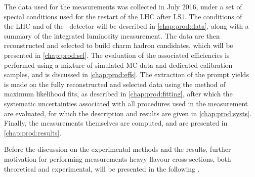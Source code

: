 The data used for the measurements was collected in July 2016, under a set of 
special conditions used for the restart of the \ac{LHC} after \ac{LS1}.
The conditions of the \ac{LHC} and of the \lhcb\ detector will be described in 
\cref{chap:prod:data}, along with a summary of the integrated luminosity 
measurement.
The data are then reconstructed and selected to build charm hadron candidates, 
which will be presented in \cref{chap:prod:sel}.
The evaluation of the associated efficiencies is performed using a mixture of 
simulated \acl{MC} data and dedicated calibration samples, and is discussed in 
\cref{chap:prod:effs}.
The extraction of the prompt yields is made on the fully reconstructed and 
selected data using the method of maximum likelihood fits, as described in 
\cref{chap:prod:fitting}, after which the systematic uncertainties associated 
with all procedures used in the measurement are evaluated, for which the 
description and results are given in \cref{chap:prod:systs}.
Finally, the measurements themselves are computed, and are presented in 
\cref{chap:prod:results}.

Before the discussion on the experimental methods and the results, further 
motivation for performing measurements heavy flavour cross-sections, both 
theoretical and experimental, will be presented in the following 
.




